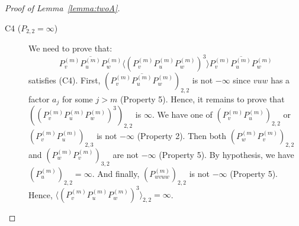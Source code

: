 \documentclass[10pt,a4paper]{amsart}
\theoremstyle{definition}
\numberwithin{equation}{section}
\theoremstyle{remark}
\theoremstyle{remark}
\begin{document}
\begin{proof}[Proof of Lemma~\ref{lemma:twoA}]
\begin{description}
\item[C4 ($P_{2,2} = \infty$)] We need to prove that:
$$\overline{P^{(m)}_v P^{(m)}_u P^{(m)}_w} \langle (P^{(m)}_v P^{(m)}_u P^{(m)}_w)^3 \rangle \overline{P^{(m)}_v P^{(m)}_u P^{(m)}_w}$$
satisfies (C4).
First, $(\overline{P^{(m)}_v P^{(m)}_u P^{(m)}_w})_{2,2}$ is not $-\infty$ since $vuw$ has a factor $a_j$ for some $j>m$ (Property 5). Hence, it remains to prove that $((P^{(m)}_v P^{(m)}_u P^{(m)}_w)^3)_{2,2}$ is $\infty$. We have one of $(P^{(m)}_v P^{(m)}_u)_{2,2}$ or $(P^{(m)}_v P^{(m)}_u)_{2,3}$ is not $-\infty$ (Property 2). Then both $(P^{(m)}_w P^{(m)}_v)_{2,2}$ and $(P^{(m)}_w P^{(m)}_v)_{3,2}$ are not $-\infty$ (Property 5). By hypothesis, we have $(P^{(m)}_u)_{2,2} = \infty$. And finally, $(P^{(m)}_{wvuw})_{2,2}$ is not $-\infty$ (Property 5). Hence, $\langle (P^{(m)}_v P^{(m)}_u P^{(m)}_w)^3 \rangle_{2,2} = \infty$.\qedhere

\end{description}
\end{proof}
\end{document}
